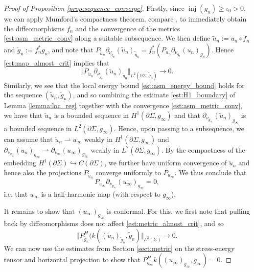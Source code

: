 \documentclass[10pt,reqno]{amsart}
\theoremstyle{plain}
\theoremstyle{definition}
\numberwithin{equation}{section}
\newcommand{\Si}{\Sigma}
\newcommand{\embed}{\hookrightarrow}
\DeclareMathOperator{\inj}{inj}
\newcommand{\norm}[1]{\Vert#1\Vert}
\newcommand{\p}{\partial} %
\begin{document}
\begin{proof}[Proof of Proposition \ref{prop:sequence_converge}]
	Firstly, since $\inj(g_n) \geq \iota_0 > 0$, we can apply Mumford's compactness theorem, compare \cite{Tromba}, to immediately obtain the diffeomorphisms $f_n$ and the convergence of the metrics \eqref{est:asm_metric_conv} along a suitable subsequence. We then define $\tilde{u}_n := u_n \circ f_n$ and $\tilde{g}_n := f_n^* g_n$, and note that $P_{\tilde{u}_n} \p_{\nu_{\tilde{g}_n}} (\tilde{u}_n)_{\tilde{g}_n} = f_n^*\left(P_{u_n}\p_{\nu_{g_n}} (u_n)_{g_n}\right)$. Hence  \eqref{est:map_almost_crit} implies that 
	\begin{equation}\label{est:u_tilde_ac}
		\norm{P_{\tilde{u}_n}\p_{\nu_{\tilde{g}_n}} (\tilde{u}_n)_{\tilde{g}_n}}_{L^2(\p\Si,\tilde{g}_n)} \rightarrow 0.
	\end{equation}
	Similarly, we see that the local energy bound \eqref{est:asm_energy_bound} holds for the sequence $(\tilde{u}_n,\tilde{g}_n)$, and so combining the estimate \eqref{est:H1_boundary} of Lemma \ref{lemma:loc_reg} together with the convergence \eqref{est:asm_metric_conv}, we have that $\tilde{u}_n$ is a bounded sequence in $H^1(\p\Si,g_\infty)$ and that $\p_{\nu_{g_\infty}}\left(\tilde{u}_n\right)_{g_\infty}$ is a bounded sequence in $L^2(\p\Si,g_\infty)$. Hence, upon passing to a subsequence, we can assume that $\tilde{u}_n \rightharpoonup u_\infty$ weakly in $H^1(\p\Si,g_\infty)$ and $\p_{\nu_{g_\infty}}\left(\tilde{u}_n\right)_{g_\infty} \rightharpoonup \p_{\nu_\infty} (u_\infty)_{g_\infty}$ weakly in $L^2(\p\Si,g_\infty)$. By the compactness of the embedding $H^1(\p\Si) \embed C(\p\Si)$, we further have uniform convergence of $\tilde{u}_n$ and hence also the projections $P_{\tilde{u}_n}$ converge uniformly to $P_{u_\infty}$. We thus conclude that 
    \begin{equation*}
		P_{u_\infty}\p_{\nu_{g_\infty}}(u_\infty)_{g_\infty} = 0,
	\end{equation*}
    i.e. that $u_\infty$ is a half-harmonic map (with respect to $g_\infty$).
	
	It remains to show that $(u_\infty)_{g_\infty}$ is conformal. For this, we first note that pulling back by diffeomorphisms does not affect \eqref{est:metric_almost_crit}, and so
	\begin{equation*}
		\norm{P_{\tilde{g}_n}^{H}(k((\tilde{u}_n)_{\tilde{g}_n},\tilde{g}_n)}_{L^2(\Si)} \rightarrow 0.
	\end{equation*}
	We can now use the estimates from Section \ref{sect:metric} on the stress-energy tensor and horizontal projection to show that $P_{g_\infty}^{H}k((u_\infty)_{g_\infty},g_\infty) = 0$. 


\end{proof}
\end{document}
